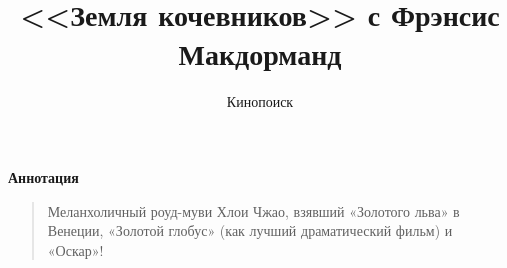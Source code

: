 \documentclass[a4paper,11pt,draft]{article} %
\title{\Huge{<<Земля кочевников>> с Фрэнсис Макдорманд}}
\author{\LARGE{Кинопоиск}}
\begin{document}
	\maketitle
	
	\begin{center}
		\bf
		Аннотация
	\end{center}
	
	\begin{quote}
		\begin{center}
			\small
			Меланхоличный роуд-муви Хлои Чжао, взявший «Золотого льва» в Венеции, «Золотой глобус» (как лучший драматический фильм) и «Оскар»!
		\end{center}
	\end{quote}
\end{document}
